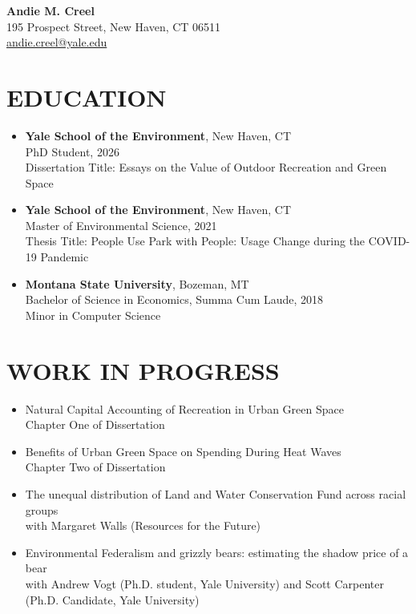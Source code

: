 \documentclass[11pt]{article}
\begin{document}
\begin{center}
    \textbf{\Huge Andie M. Creel} \\
    195 Prospect Street, New Haven, CT 06511 \\
    \href{mailto:andie.creel@yale.edu}{andie.creel@yale.edu}
\end{center}

\section*{EDUCATION}
\begin{itemize}[left=0pt]
    \item \textbf{Yale School of the Environment}, New Haven, CT \\
    PhD Student, 2026 \\
    Dissertation Title: Essays on the Value of Outdoor Recreation and Green Space
    \item \textbf{Yale School of the Environment}, New Haven, CT \\
    Master of Environmental Science, 2021 \\
    Thesis Title: People Use Park with People: Usage Change during the COVID-19 Pandemic
    \item \textbf{Montana State University}, Bozeman, MT \\
    Bachelor of Science in Economics, Summa Cum Laude, 2018 \\
    Minor in Computer Science
\end{itemize}

\section*{WORK IN PROGRESS}
\begin{itemize}[left=0pt]
    \item Natural Capital Accounting of Recreation in Urban Green Space \\
    Chapter One of Dissertation
    \item Benefits of Urban Green Space on Spending During Heat Waves \\
    Chapter Two of Dissertation
    \item The unequal distribution of Land and Water Conservation Fund across racial groups \\
    with Margaret Walls (Resources for the Future)
    \item Environmental Federalism and grizzly bears: estimating the shadow price of a bear \\
    with Andrew Vogt (Ph.D. student, Yale University) and Scott Carpenter (Ph.D. Candidate, Yale University)
\end{itemize}
\end{document}
